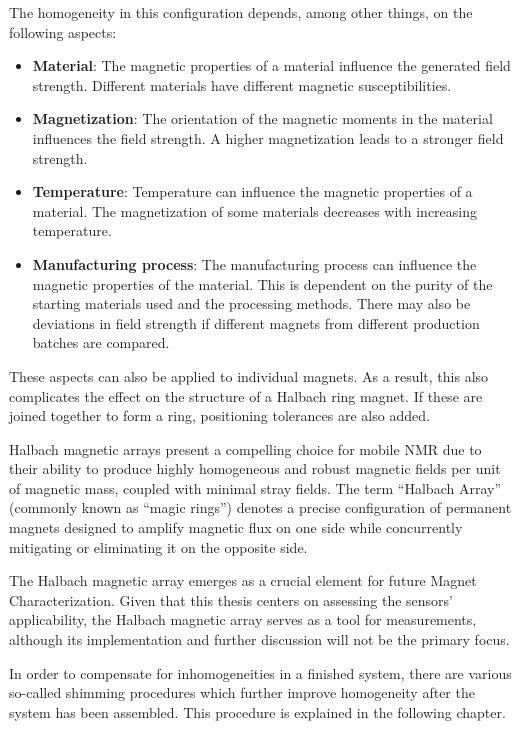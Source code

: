 The homogeneity in this configuration depends, among other things, on
the following aspects:

\begin{itemize}
\item
  \textbf{Material}: The magnetic properties of a material influence the
  generated field strength. Different materials have different magnetic
  susceptibilities.
\item
  \textbf{Magnetization}: The orientation of the magnetic moments in the
  material influences the field strength. A higher magnetization leads
  to a stronger field strength.
\item
  \textbf{Temperature}: Temperature can influence the magnetic
  properties of a material. The magnetization of some materials
  decreases with increasing temperature.
\item
  \textbf{Manufacturing process}: The manufacturing process can
  influence the magnetic properties of the material. This is dependent
  on the purity of the starting materials used and the processing
  methods. There may also be deviations in field strength if different
  magnets from different production batches are compared.
  \cite{inbook}
\end{itemize}

These aspects can also be applied to individual magnets. As a result,
this also complicates the effect on the structure of a Halbach ring
magnet. If these are joined together to form a ring, positioning
tolerances are also added.

Halbach magnetic arrays present a compelling choice for mobile NMR due
to their ability to produce highly homogeneous and robust magnetic
fields per unit of magnetic mass, coupled with minimal stray fields. The
term ``Halbach Array'' (commonly known as ``magic rings'') denotes a
precise configuration of permanent magnets designed to amplify magnetic
flux on one side while concurrently mitigating or eliminating it on the
opposite side. \cite{inbook}

The Halbach magnetic array emerges as a crucial element for future
Magnet Characterization. Given that this thesis centers on assessing the
sensors' applicability, the Halbach magnetic array serves as a tool for
measurements, although its implementation and further discussion will
not be the primary focus.

In order to compensate for inhomogeneities in a finished system, there
are various so-called shimming procedures which further improve
homogeneity after the system has been assembled. This procedure is
explained in the following chapter.

